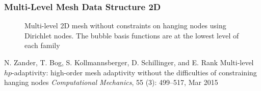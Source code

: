 \begin{frame}
	\frametitle{Multi-Level Mesh Data Structure 2D}
	\begin{figure}
        \centering
	
	\caption{\alert{Multi-level} 2D mesh without constraints on hanging nodes using Dirichlet nodes. The bubble basis functions are at the \alert{lowest level} of each family \label{fig:Multilevel}}
	\end{figure}
	\vfill
	\begin{thebibliography}{10}
	\beamertemplatearticlebibitems
	\scriptsize
	N. Zander, T. Bog, S. Kollmannsberger, D. Schillinger, and E. Rank
	\newblock Multi-level $hp$-adaptivity: high-order mesh adaptivity without the
  	difficulties of constraining hanging nodes
	\newblock \emph{Computational Mechanics}, 55 (3): 499--517,
  	Mar 2015
	\end{thebibliography}
\end{frame}